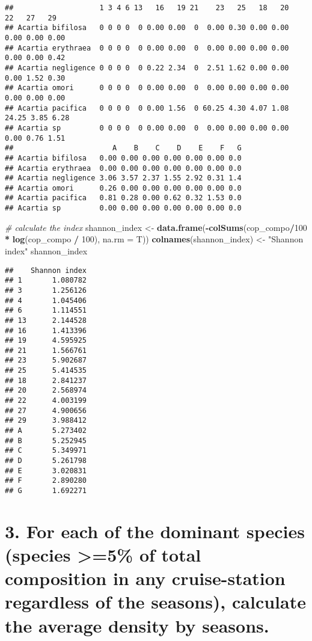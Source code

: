 \documentclass[
]{article}
\newenvironment{Shaded}{\begin{snugshade}}{\end{snugshade}}
\newcommand{\AttributeTok}[1]{\textcolor[rgb]{0.13,0.29,0.53}{#1}}
\newcommand{\CommentTok}[1]{\textcolor[rgb]{0.56,0.35,0.01}{\textit{#1}}}
\newcommand{\DecValTok}[1]{\textcolor[rgb]{0.00,0.00,0.81}{#1}}
\newcommand{\FunctionTok}[1]{\textcolor[rgb]{0.13,0.29,0.53}{\textbf{#1}}}
\newcommand{\NormalTok}[1]{#1}
\newcommand{\OtherTok}[1]{\textcolor[rgb]{0.56,0.35,0.01}{#1}}
\newcommand{\SpecialCharTok}[1]{\textcolor[rgb]{0.81,0.36,0.00}{\textbf{#1}}}
\newcommand{\StringTok}[1]{\textcolor[rgb]{0.31,0.60,0.02}{#1}}
\begin{document}
\begin{verbatim}
##                    1 3 4 6 13   16   19 21    23   25   18   20    22   27   29
## Acartia bifilosa   0 0 0 0  0 0.00 0.00  0  0.00 0.30 0.00 0.00  0.00 0.00 0.00
## Acartia erythraea  0 0 0 0  0 0.00 0.00  0  0.00 0.00 0.00 0.00  0.00 0.00 0.42
## Acartia negligence 0 0 0 0  0 0.22 2.34  0  2.51 1.62 0.00 0.00  0.00 1.52 0.30
## Acartia omori      0 0 0 0  0 0.00 0.00  0  0.00 0.00 0.00 0.00  0.00 0.00 0.00
## Acartia pacifica   0 0 0 0  0 0.00 1.56  0 60.25 4.30 4.07 1.08 24.25 3.85 6.28
## Acartia sp         0 0 0 0  0 0.00 0.00  0  0.00 0.00 0.00 0.00  0.00 0.76 1.51
##                       A    B    C    D    E    F   G
## Acartia bifilosa   0.00 0.00 0.00 0.00 0.00 0.00 0.0
## Acartia erythraea  0.00 0.00 0.00 0.00 0.00 0.00 0.0
## Acartia negligence 3.06 3.57 2.37 1.55 2.92 0.31 1.4
## Acartia omori      0.26 0.00 0.00 0.00 0.00 0.00 0.0
## Acartia pacifica   0.81 0.28 0.00 0.62 0.32 1.53 0.0
## Acartia sp         0.00 0.00 0.00 0.00 0.00 0.00 0.0
\end{verbatim}

\begin{Shaded}
\begin{Highlighting}[]
\CommentTok{\# calculate the index}
\NormalTok{shannon\_index }\OtherTok{\textless{}{-}} \FunctionTok{data.frame}\NormalTok{(}\SpecialCharTok{{-}}\FunctionTok{colSums}\NormalTok{(cop\_compo}\SpecialCharTok{/}\DecValTok{100} \SpecialCharTok{*} \FunctionTok{log}\NormalTok{(cop\_compo }\SpecialCharTok{/} \DecValTok{100}\NormalTok{), }\AttributeTok{na.rm =}\NormalTok{ T))}
\FunctionTok{colnames}\NormalTok{(shannon\_index) }\OtherTok{\textless{}{-}} \StringTok{"Shannon index"}
\NormalTok{shannon\_index}
\end{Highlighting}
\end{Shaded}

\begin{verbatim}
##    Shannon index
## 1       1.080782
## 3       1.256126
## 4       1.045406
## 6       1.114551
## 13      2.144528
## 16      1.413396
## 19      4.595925
## 21      1.566761
## 23      5.902687
## 25      5.414535
## 18      2.841237
## 20      2.568974
## 22      4.003199
## 27      4.900656
## 29      3.988412
## A       5.273402
## B       5.252945
## C       5.349971
## D       5.261798
## E       3.020831
## F       2.890280
## G       1.692271
\end{verbatim}

\section{3. For each of the dominant species (species \textgreater=5\%
of total composition in any cruise-station regardless of the seasons),
calculate the average density by
seasons.}\label{for-each-of-the-dominant-species-species-5-of-total-composition-in-any-cruise-station-regardless-of-the-seasons-calculate-the-average-density-by-seasons.}
\end{document}
